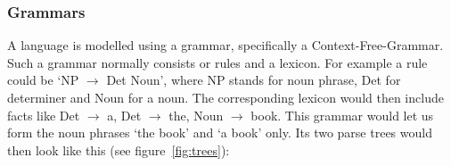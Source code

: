 







\subsubsection{Grammars}
\label{s:grammars}

A language is modelled using a grammar, specifically a Context-Free-Grammar. Such a grammar normally consists or rules and a lexicon. For example a rule could be `NP $\to$ Det Noun', where NP stands for noun phrase, Det for determiner and Noun for a noun. The corresponding lexicon would then include facts like Det $\to$ a, Det $\to$ the, Noun $\to$ book. This grammar would let us form the noun phrases `the book' and `a book' only. Its two parse trees would then look like this (see figure~\ref{fig:trees}):

